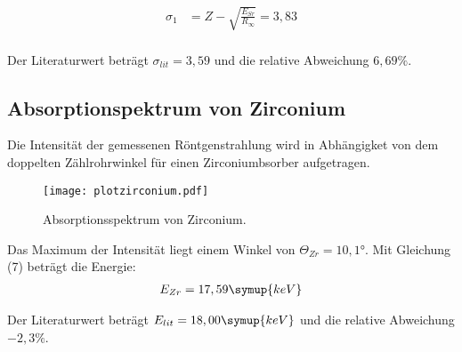 \begin{align*}
  \sigma_1 &= Z - \sqrt{\frac{E_{Sr}}{R_{\infty}}} = 3,83 \\
\end{align*}

Der Literaturwert beträgt $\sigma_{lit} = 3,59$ und die relative Abweichung $6,69\%$.


\subsection{Absorptionspektrum von Zirconium}

Die Intensität der gemessenen Röntgenstrahlung wird in Abhängigket von dem doppelten Zählrohrwinkel für
einen Zirconiumbsorber aufgetragen.

\begin{figure}
  \centering
  \texttt{[image: plotzirconium.pdf]}
  \caption{Absorptionsspektrum von Zirconium.}
  \label{fig:plot}
\end{figure}


Das Maximum der Intensität liegt einem Winkel von $\Theta_{Zr} = 10,1°$.
Mit Gleichung (7) beträgt die Energie:
\begin{align*}
  E_{Zr} = 17,59 \symup{keV}
\end{align*}

Der Literaturwert beträgt $E_{lit} = 18,00 \symup{keV}$ und die relative Abweichung $-2,3\%$.
